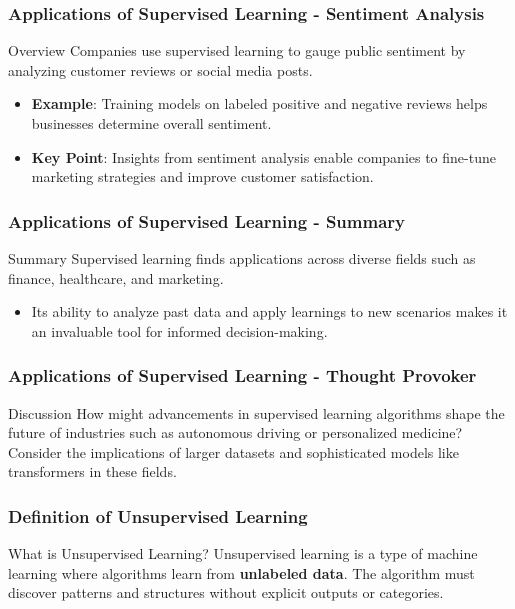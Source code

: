 \documentclass[aspectratio=169]{beamer}
\begin{document}
\begin{frame}[fragile]
  \frametitle{Applications of Supervised Learning - Sentiment Analysis}
  \begin{block}{Overview}
    Companies use supervised learning to gauge public sentiment by analyzing customer reviews or social media posts.
  \end{block}
  \begin{itemize}
    \item \textbf{Example}: Training models on labeled positive and negative reviews helps businesses determine overall sentiment.
    \item \textbf{Key Point}: Insights from sentiment analysis enable companies to fine-tune marketing strategies and improve customer satisfaction.
  \end{itemize}
\end{frame}

\begin{frame}[fragile]
  \frametitle{Applications of Supervised Learning - Summary}
  \begin{block}{Summary}
    Supervised learning finds applications across diverse fields such as finance, healthcare, and marketing.
  \end{block}
  \begin{itemize}
    \item Its ability to analyze past data and apply learnings to new scenarios makes it an invaluable tool for informed decision-making.
  \end{itemize}
\end{frame}

\begin{frame}[fragile]
  \frametitle{Applications of Supervised Learning - Thought Provoker}
  \begin{questionblock}{Discussion}
    How might advancements in supervised learning algorithms shape the future of industries such as autonomous driving or personalized medicine? 
    Consider the implications of larger datasets and sophisticated models like transformers in these fields.
  \end{questionblock}
\end{frame}

\begin{frame}[fragile]
    \frametitle{Definition of Unsupervised Learning}
    \begin{block}{What is Unsupervised Learning?}
        Unsupervised learning is a type of machine learning where algorithms learn from \textbf{unlabeled data}. The algorithm must discover patterns and structures without explicit outputs or categories.
    \end{block}
\end{frame}
\end{document}
